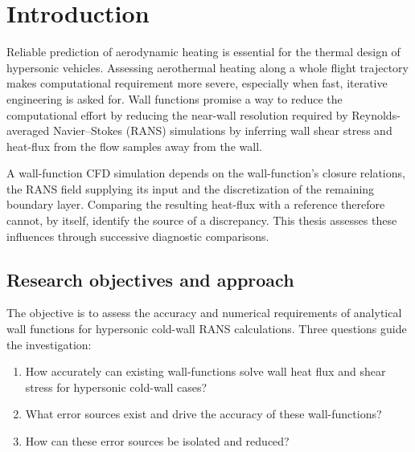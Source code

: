 \chapter{Introduction}
\label{chap:introduction}
\label{chap:00_Motivation}

Reliable prediction of aerodynamic heating is essential for the thermal design of hypersonic vehicles. Assessing aerothermal heating along a whole flight trajectory makes computational requirement more severe, especially when fast, iterative engineering is asked for. Wall functions promise a way to reduce the computational effort by reducing the near-wall resolution required by Reynolds-averaged Navier--Stokes (RANS) simulations by inferring wall shear stress and heat-flux from the flow samples away from the wall.
\par\medskip

A wall-function CFD simulation depends on the wall-function's closure relations, the RANS field supplying its input and the discretization of the remaining boundary layer. Comparing the resulting heat-flux with a reference therefore cannot, by itself, identify the source of a discrepancy. This thesis assesses these influences through successive diagnostic comparisons.

\section{Research objectives and approach}
\label{sec:introduction:research-questions-objectives}
\label{sec:introduction:contributions}

The objective is to assess the accuracy and numerical requirements of analytical wall functions for hypersonic cold-wall RANS calculations. Three questions guide the investigation:
\begin{enumerate}
    \item How accurately can existing wall-functions solve wall heat flux and shear stress for hypersonic cold-wall cases?
    \item What error sources exist and drive the accuracy of these wall-functions?
    \item How can these error sources be isolated and reduced? 
\end{enumerate}

